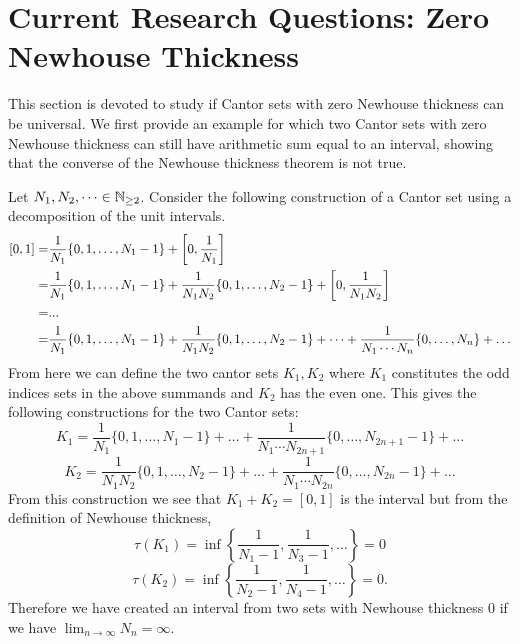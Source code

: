 \section{Current Research Questions: Zero Newhouse Thickness} 
This section is devoted to study  if Cantor sets with zero Newhouse thickness can be universal. We first  provide an example for  which two Cantor sets with zero Newhouse thickness can still have arithmetic sum equal  to an interval,  showing that the converse of the Newhouse thickness theorem is  not true.   %
\begin{example}
{\rm Let $N_1, N_2, \dots \in \mathbb{N}_{\geq 2}$. Consider the following construction of a Cantor set using a decomposition of the unit intervals. }
$$\begin{aligned}
    \relax[0,1] = &\frac{1}{N_1}\{0,1, \dots, N_1-1\} + \left[0,\frac{1}{N_1}\right]\\
    = & \frac{1}{N_1}\{0,1, \dots, N_1-1\} + \frac{1}{N_1 N_2}\{0,1, \dots, N_2-1\} + \left[0,\frac{1}{N_1 N_2}\right]\\
    =&...\\
    =&\frac{1}{N_1}\{0,1, \dots, N_1-1\} +  \frac{1}{N_1 N_2}\{0,1, \dots, N_2-1\} + \dots + \frac{1}{N_1 \cdots N_n} \{0,\dots, N_n \}+ \dots
\end{aligned}$$
{\rm From here we can define the two cantor sets $K_1, K_2$ where $K_1$ constitutes the odd indices sets in the above summands and $K_2$ has the even one.   This gives the following constructions for the two Cantor sets: }
$$K_1 = \frac{1}{N_1}\{0,1, \dots, N_1-1\}  + \dots + \frac{1}{N_1 \cdots N_{2n+1}} \{0,\dots, N_{2n+1}-1 \}+ \dots$$
$$K_2 = \frac{1}{N_1N_2}\{0,1, \dots, N_2-1\}  + \dots +\frac{1}{N_1 \cdots N_{2n}} \{0,\dots, N_{2n}-1 \}+ \dots$$
{\rm From this construction we see that $K_1 + K_2 = [0,1]$ is the interval but from the definition of Newhouse thickness, }
$$\tau(K_1) = \inf \left\{\frac{1}{N_1-1}, \frac{1}{N_3-1},\dots\right\} = 0 $$
$$\tau(K_2) = \inf \left\{\frac{1}{N_2-1}, \frac{1}{N_4-1},\dots\right\} = 0.$$
{\rm Therefore we have created an interval from two sets with Newhouse thickness $0$ if we have $\lim_{n\to\infty} N_n = \infty$. }
\end{example}
\vspace{0.5cm}  


